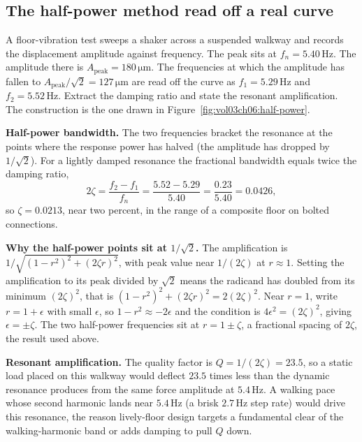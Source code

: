 \subsection{The half-power method read off a real curve}

A floor-vibration test sweeps a shaker across a suspended walkway and
records the displacement amplitude against frequency. The peak sits at
$f_n = 5.40\,\si{\hertz}$. The amplitude there is $A_{\text{peak}} =
180\,\si{\micro\meter}$. The frequencies at which the amplitude has
fallen to $A_{\text{peak}}/\sqrt2 = 127\,\si{\micro\meter}$ are read off
the curve as $f_1 = 5.29\,\si{\hertz}$ and $f_2 = 5.52\,\si{\hertz}$.
Extract the damping ratio and state the resonant amplification. The
construction is the one drawn in Figure~\ref{fig:vol03ch06:half-power}.



\textbf{Half-power bandwidth.} The two frequencies bracket the
resonance at the points where the response power has halved (the
amplitude has dropped by $1/\sqrt2$). For a lightly damped resonance the
fractional bandwidth equals twice the damping ratio,
\[
2\zeta = \frac{f_2 - f_1}{f_n} = \frac{5.52 - 5.29}{5.40} = \frac{0.23}{
5.40} = 0.0426,
\]
so $\zeta = 0.0213$, near two percent, in the range of a composite floor
on bolted connections.

\textbf{Why the half-power points sit at $1/\sqrt2$.} The amplification
is $1/\sqrt{(1 - r^2)^2 + (2\zeta r)^2}$, with peak value near
$1/(2\zeta)$ at $r \approx 1$. Setting the amplification to its peak
divided by $\sqrt2$ means the radicand has doubled from its minimum
$(2\zeta)^2$, that is $(1 - r^2)^2 + (2\zeta r)^2 = 2(2\zeta)^2$. Near
$r = 1$, write $r = 1 + \epsilon$ with small $\epsilon$, so $1 - r^2
\approx -2\epsilon$ and the condition is $4\epsilon^2 = (2\zeta)^2$,
giving $\epsilon = \pm\zeta$. The two half-power frequencies sit at
$r = 1 \pm \zeta$, a fractional spacing of $2\zeta$, the result used
above.

\textbf{Resonant amplification.} The quality factor is $Q = 1/(2\zeta)
= 23.5$, so a static load placed on this walkway would deflect $23.5$
times less than the dynamic resonance produces from the same force
amplitude at $5.4\,\si{\hertz}$. A walking pace whose second harmonic
lands near $5.4\,\si{\hertz}$ (a brisk $2.7\,\si{\hertz}$ step rate)
would drive this resonance, the reason lively-floor design targets a
fundamental clear of the walking-harmonic band or adds damping to pull
$Q$ down.

